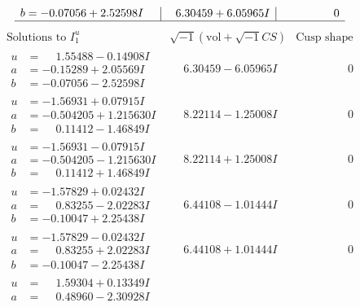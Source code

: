 \documentclass[1p]{elsarticle_modified}
\theoremstyle{definition}
\newcommand{\I}{\sqrt{-1}}
\begin{document}
$$\begin{array}{c|c|c}
\begin{aligned}
b &= -0.07056 + 2.52598 I\end{aligned}
 & \phantom{-}6.30459 + 6.05965 I & \phantom{-0.000000 } 0\\
 \hline 
 \end{array}$$\newpage$$\begin{array}{c|c|c}  
\text{Solutions to }I^u_{1}& \I (\text{vol} + \sqrt{-1}CS) & \text{Cusp shape}\\
 \hline 
\begin{aligned}
u &= \phantom{-}1.55488 - 0.14908 I \\
a &= -0.15289 + 2.05569 I \\
b &= -0.07056 - 2.52598 I\end{aligned}
 & \phantom{-}6.30459 - 6.05965 I & \phantom{-0.000000 } 0 \\ \hline\begin{aligned}
u &= -1.56931 + 0.07915 I \\
a &= -0.504205 + 1.215630 I \\
b &= \phantom{-}0.11412 - 1.46849 I\end{aligned}
 & \phantom{-}8.22114 - 1.25008 I & \phantom{-0.000000 } 0 \\ \hline\begin{aligned}
u &= -1.56931 - 0.07915 I \\
a &= -0.504205 - 1.215630 I \\
b &= \phantom{-}0.11412 + 1.46849 I\end{aligned}
 & \phantom{-}8.22114 + 1.25008 I & \phantom{-0.000000 } 0 \\ \hline\begin{aligned}
u &= -1.57829 + 0.02432 I \\
a &= \phantom{-}0.83255 - 2.02283 I \\
b &= -0.10047 + 2.25438 I\end{aligned}
 & \phantom{-}6.44108 - 1.01444 I & \phantom{-0.000000 } 0 \\ \hline\begin{aligned}
u &= -1.57829 - 0.02432 I \\
a &= \phantom{-}0.83255 + 2.02283 I \\
b &= -0.10047 - 2.25438 I\end{aligned}
 & \phantom{-}6.44108 + 1.01444 I & \phantom{-0.000000 } 0 \\ \hline\begin{aligned}
u &= \phantom{-}1.59304 + 0.13349 I \\
a &= \phantom{-}0.48960 - 2.30928 I \\

\end{aligned}
\end{array}$$
\end{document}

